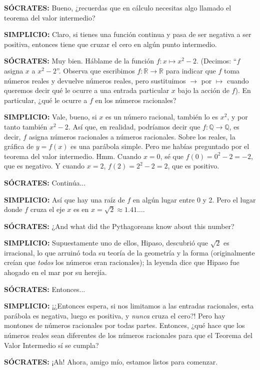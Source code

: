 \textbf{SÓCRATES:} Bueno, ¿recuerdas que en cálculo necesitas algo
llamado el teorema del valor intermedio?

\textbf{SIMPLICIO:} Claro, si tienes una función continua y pasa de ser
negativa a ser positiva, entonces tiene que cruzar el cero en algún
punto intermedio.

\textbf{SÓCRATES:} Muy bien. Háblame de la función $f : x \mapsto x^2 -
2$. (Decimos: ``$f$ asigna $x$ a $x^2 - 2$''. Observa que escribimos $f
: \mathbb{R} \to \mathbb{R}$ para indicar que $f$ toma números reales y devuelve números
reales, pero sustituimos $\to$ por $\mapsto$ cuando queremos decir qué le ocurre
a una entrada particular $x$ bajo la acción de $f$). En particular, ¿qué
le ocurre a $f$ en los números racionales?

\textbf{SIMPLICIO:} Vale, bueno, si $x$ es un número racional, también
lo es $x^2$, y por tanto también $x^2 - 2$. Así que, en realidad,
podríamos decir que $f : \mathbb{Q} \to \mathbb{Q}$, es decir, $f$ asigna números racionales
a números racionales. Sobre los reales, la gráfica de $y = f(x)$ es una
parábola simple. Pero me habías preguntado por el teorema del valor
intermedio. Hmm. Cuando $x = 0$, sé que $f(0) = 0^2 - 2 = -2$, que es
negativo. Y cuando $x = 2$, $f(2) = 2^2 - 2 = 2$, que es positivo.

\textbf{SÓCRATES:} Continúa...

\textbf{SIMPLICIO:} Así que hay una raíz de $f$ en algún lugar entre 0 y
2. Pero el lugar donde $f$ cruza el eje $x$ es en $x = \sqrt{2} \approx 1.41
\dots$.

\textbf{SÓCRATES:} ¿And what did the Pythagoreans know about this number?

\textbf{SIMPLICIO:} Supuestamente uno de ellos, Hipaso, descubrió que
$\sqrt{2}$ es irracional, lo que arruinó toda su teoría de la geometría
y la forma (originalmente creían que \textit{todos} los números eran
racionales); la leyenda dice que Hipaso fue ahogado en el mar por su
herejía.

\textbf{SÓCRATES:} Entonces...

\textbf{SIMPLICIO:} ¡¿Entonces espera, si nos limitamos a las entradas
racionales, esta parábola es negativa, luego es positiva, y
\textit{nunca} cruza el cero?! Pero hay montones de números racionales
por todas partes. Entonces, ¿qué hace que los números reales sean
diferentes de los números racionales para que el Teorema del Valor
Intermedio sí se cumpla?

\textbf{SÓCRATES:} ¡Ah! Ahora, amigo mío, estamos listos para comenzar.

